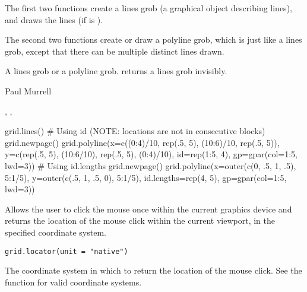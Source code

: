 %
\begin{Details}\relax
The first two functions create a lines grob (a graphical object describing
lines), and 
draws the lines (if  is ).

The second two functions create or draw a polyline grob,
which is just like a lines grob, except that there can be
multiple distinct lines drawn.
\end{Details}
%
\begin{Value}
A lines grob or a polyline grob.
 returns a lines grob invisibly.
\end{Value}
%
\begin{Author}\relax
Paul Murrell
\end{Author}
%
\begin{SeeAlso}\relax
{},
,
\end{SeeAlso}
%
\begin{Examples}
\begin{ExampleCode}
grid.lines()
# Using id (NOTE: locations are not in consecutive blocks)
grid.newpage()
grid.polyline(x=c((0:4)/10, rep(.5, 5), (10:6)/10, rep(.5, 5)),
             y=c(rep(.5, 5), (10:6/10), rep(.5, 5), (0:4)/10),
             id=rep(1:5, 4),
             gp=gpar(col=1:5, lwd=3))
# Using id.lengths
grid.newpage()
grid.polyline(x=outer(c(0, .5, 1, .5), 5:1/5),
             y=outer(c(.5, 1, .5, 0), 5:1/5),
             id.lengths=rep(4, 5),
             gp=gpar(col=1:5, lwd=3))
\end{ExampleCode}
\end{Examples}
%
\begin{Description}\relax
Allows the user to click the mouse once within the current
graphics
device and returns the location of the mouse click within the
current viewport, in the specified coordinate system.
\end{Description}
%
\begin{Usage}
\begin{verbatim}
grid.locator(unit = "native")
\end{verbatim}
\end{Usage}
%
\begin{Arguments}
\begin{ldescription}
\item[\code{unit}]  The coordinate system in which to return the location
of the mouse click.
See the  function for valid coordinate systems.
\end{ldescription}
\end{Arguments}
